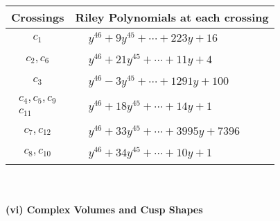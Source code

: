 \documentclass[1p]{elsarticle_modified}
\theoremstyle{definition}
\begin{document}
\begin{tabular}{m{50pt}|m{274pt}}
Crossings & \hspace{64pt}Riley Polynomials at each crossing \\
\hline $$\begin{aligned}c_{1}\end{aligned}$$&$\begin{aligned}
&y^{46}+9 y^{45}+\cdots+223 y+16
\end{aligned}$\\
\hline $$\begin{aligned}c_{2},c_{6}\end{aligned}$$&$\begin{aligned}
&y^{46}+21 y^{45}+\cdots+11 y+4
\end{aligned}$\\
\hline $$\begin{aligned}c_{3}\end{aligned}$$&$\begin{aligned}
&y^{46}-3 y^{45}+\cdots+1291 y+100
\end{aligned}$\\
\hline $$\begin{aligned}c_{4},c_{5},c_{9}\\c_{11}\end{aligned}$$&$\begin{aligned}
&y^{46}+18 y^{45}+\cdots+14 y+1
\end{aligned}$\\
\hline $$\begin{aligned}c_{7},c_{12}\end{aligned}$$&$\begin{aligned}
&y^{46}+33 y^{45}+\cdots+3995 y+7396
\end{aligned}$\\
\hline $$\begin{aligned}c_{8},c_{10}\end{aligned}$$&$\begin{aligned}
&y^{46}+34 y^{45}+\cdots+10 y+1
\end{aligned}$\\
\hline
\end{tabular}\\~\\
\newpage\flushleft \textbf{(vi) Complex Volumes and Cusp Shapes}
\end{document}
